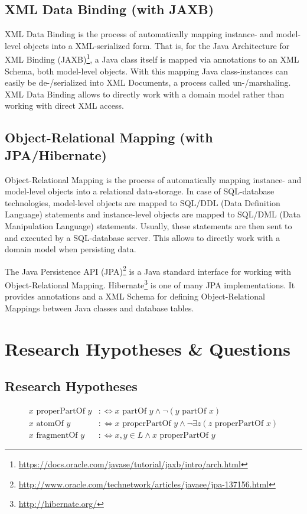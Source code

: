 \documentclass[runningheads,a4paper]{llncs}
\newcommand{\partOf}{\text{~partOf~}}
\newcommand{\properPartOf}{\text{~properPartOf~}}
\newcommand{\atomOf}{\text{~atomOf~}}
\newcommand{\fragmentOf}{\text{~fragmentOf~}}
\newcommand{\footnoteurl}[1]{\footnote{\url{#1}}}
\begin{document}
\subsection{XML Data Binding (with JAXB)}
XML Data Binding is the process of automatically mapping instance- and model-level objects into a XML-serialized form.
That is, for the Java Architecture for XML Binding (JAXB)\footnoteurl{https://docs.oracle.com/javase/tutorial/jaxb/intro/arch.html}, a Java class itself is mapped via annotations to an XML Schema, both model-level objects.
With this mapping Java class-instances can easily be de-/serialized into XML Documents, a process called un-/marshaling.
XML Data Binding allows to directly work with a domain model rather than working with direct XML access.

\subsection{Object-Relational Mapping (with JPA/Hibernate)}
Object-Relational Mapping is the process of automatically mapping instance- and model-level objects into a relational data-storage.
In case of SQL-database technologies, model-level objects are mapped to SQL/DDL (Data Definition Language) statements and instance-level objects are mapped to SQL/DML (Data Manipulation Language) statements.
Usually, these statements are then sent to and executed by a SQL-database server.
This allows to directly work with a domain model when persisting data.

The Java Persistence API (JPA)\footnoteurl{http://www.oracle.com/technetwork/articles/javaee/jpa-137156.html} is a Java standard interface for working with Object-Relational Mapping.
Hibernate\footnoteurl{http://hibernate.org/} is one of many JPA implementations.
It provides annotations and a XML Schema for defining Object-Relational Mappings between Java classes and database tables.

\section{Research Hypotheses \& Questions}
\label{section:ResearchHypthesesAndQuestions}
\subsection{Research Hypotheses}

\begin{align*}
x \properPartOf y &:\Leftrightarrow x \partOf y \wedge \neg (y \partOf x)
\\
x \atomOf y &:\Leftrightarrow x \properPartOf y \wedge \neg \exists z(z \properPartOf x)
\\
x \fragmentOf y &:\Leftrightarrow x,y \in L \wedge x \properPartOf y
\end{align*}
\end{document}
